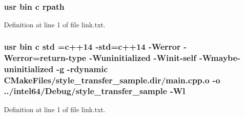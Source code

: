 \subsubsection[{\texorpdfstring{rpath}{rpath}}]{\setlength{\rightskip}{0pt plus 5cm}usr bin {\bf c} rpath}\hypertarget{style__transfer__sample_2CMakeFiles_2style__transfer__sample_8dir_2link_8txt_ab9d7fd7120fafa2118a4e08c1df697c7}{}\label{style__transfer__sample_2CMakeFiles_2style__transfer__sample_8dir_2link_8txt_ab9d7fd7120fafa2118a4e08c1df697c7}


Definition at line 1 of file link.\+txt.

\subsubsection[{\texorpdfstring{std}{std}}]{\setlength{\rightskip}{0pt plus 5cm}usr bin {\bf c} std ={\bf c}++14 -\/std={\bf c}++14 -\/Werror -\/Werror=return-\/type -\/Wuninitialized -\/Winit-\/self -\/Wmaybe-\/uninitialized -\/g -\/rdynamic C\+Make\+Files/style\+\_\+transfer\+\_\+sample.\+dir/main.\+cpp.\+o -\/o ../intel64/Debug/style\+\_\+transfer\+\_\+sample -\/{\bf Wl}}\hypertarget{style__transfer__sample_2CMakeFiles_2style__transfer__sample_8dir_2link_8txt_a1ccfea5f558575a112db71eeb271fabf}{}\label{style__transfer__sample_2CMakeFiles_2style__transfer__sample_8dir_2link_8txt_a1ccfea5f558575a112db71eeb271fabf}


Definition at line 1 of file link.\+txt.

